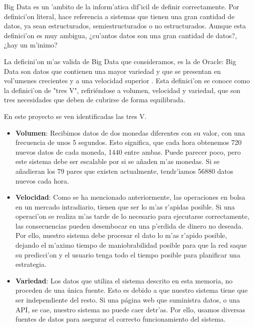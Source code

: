 Big Data es un 'ambito de la inform'atica dif'icil de definir correctamente. Por definici'on literal, hace referencia a sistemas que tienen una gran cantidad de datos, ya sean estructurados, semiestructurados o no estructurados. Aunque esta definici'on es muy ambigua, ¿cu'antos datos son una gran cantidad de datos?,¿hay un m'inimo? 

La deficini'on m'as valida de Big Data que consideramos, es la de Oracle:  Big Data son datos que contienen una mayor variedad y que se presentan en vol'umenes crecientes y a una velocidad superior \cite{bigdata1}. Esta definici'on se conoce como la definici'on de "tres V", refiriéndose a volumen, velocidad y variedad, que son tres necesidades que deben de cubrirse de forma equilibrada.

En este proyecto se ven identificadas las tres V. 
\begin{itemize}
\item \textbf{Volumen}: Recibimos datos de dos monedas diferentes con su valor, con una frecuencia de unos 5 segundos. Esto significa, que cada hora obtenemos 720 nuevos datos de cada moneda, 1440 entre ambas. Puede parecer poco, pero este sistema debe ser escalable por si se añaden m'as monedas. Si se añadieran los 79 pares \cite{bigdata2} que existen actualmente, tendr'iamos 56880 datos nuevos cada hora. 

\item \textbf{Velocidad}: Como se ha mencionado anteriormente, las operaciones en bolsa en un mercado intradiario, tienen que ser lo m'as r'apidas posible. Si una operaci'on se realiza m'as tarde de lo necesario para ejecutarse correctamente, las consecuencias pueden desembocar en una p'erdida de dinero no deseada. Por ello, nuestro sistema debe procesar el dato lo m'as r'apido posible, dejando el m'aximo tiempo de maniobrabilidad posible para que la red saque su predicci'on y el usuario tenga todo el tiempo posible para planificar una estrategia.  

\item \textbf{Variedad}: Los datos que utiliza el sistema descrito en esta memoria, no proceden de una única fuente. Esto es debido a que nuestro sistema tiene que ser independiente del resto. Si una página web que suministra datos, o una API, se cae, nuestro sistema no puede caer detr'as. Por ello, usamos diversas fuentes de datos para asegurar el correcto funcionamiento del sistema. 

\end{itemize}



